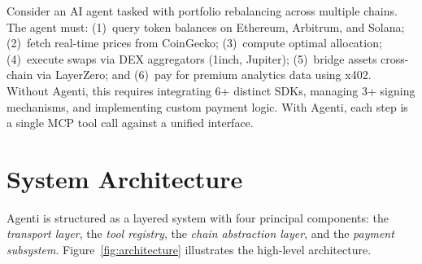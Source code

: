 \documentclass[11pt]{article}
\begin{document}
Consider an AI agent tasked with portfolio rebalancing across multiple chains. The agent must: (1)~query token balances on Ethereum, Arbitrum, and Solana; (2)~fetch real-time prices from CoinGecko; (3)~compute optimal allocation; (4)~execute swaps via DEX aggregators (1inch, Jupiter); (5)~bridge assets cross-chain via LayerZero; and (6)~pay for premium analytics data using x402. Without Agenti, this requires integrating 6+ distinct SDKs, managing 3+ signing mechanisms, and implementing custom payment logic. With Agenti, each step is a single MCP tool call against a unified interface.

\section{System Architecture}
\label{sec:architecture}

Agenti is structured as a layered system with four principal components: the \emph{transport layer}, the \emph{tool registry}, the \emph{chain abstraction layer}, and the \emph{payment subsystem}. Figure~\ref{fig:architecture} illustrates the high-level architecture.
\end{document}
